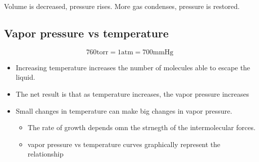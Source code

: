 \documentclass{article}
\theoremstyle{mytheoremstyle}
\theoremstyle{mytheoremstyle}
\theoremstyle{myproblemstyle}
\begin{document}
Volume is decreased, pressure rises. More gas condenses, pressure is restored.

\subsection{Vapor pressure vs temperature}

\[760\mathrm{torr} = 1\mathrm{atm} = 700\mathrm{mmHg}\]

\begin{itemize}
    \item Increasing temperature increases the number of molecules able to escape the liquid.
    \item The net result is that as temperature increases, the vapor pressure increases
    \item Small changes in temperature can make big changes in vapor pressure.
    \begin{itemize}
        \item  The rate of growth depends omn the strnegth of the intermolecular forces.
        \item vapor pressure vs temperature curves graphically represent the relationship
    \end{itemize}
\end{itemize}
\end{document}
